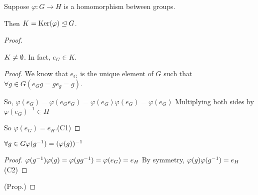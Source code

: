 \documentclass[notes.tex]{subfiles}
\begin{document}
\begin{proposition}
	Suppose $\varphi:G\to H$ is a homomorphism between groups. 

	Then $K=\operatorname{\mathrm{Ker}}(\varphi) \trianglelefteq G$.
\end{proposition}
\begin{proof}
	\begin{claim}[1]
		$K \ne \emptyset$. In fact, $e_G\in K$.
	\end{claim}
	\begin{proof}
		We know that $e_G$ is the unique element of $G$ such that $\forall g\in G(e_Gg=ge_g = g)$.

		So, $\varphi(e_G) = \varphi(e_Ge_G) = \varphi(e_G)\varphi(e_G) = \varphi(e_G)$
		Multiplying both sides by $\varphi(e_G)^{-1}\in H$

		So $\varphi(e_G) = e_H$.\qedhere(C1)
	\end{proof}

	\begin{claim}[2]
		$\forall g\in G \varphi({g}^{-1}) = (\varphi(g))^{-1}$
	\end{claim}
	\begin{proof}
		$\varphi({g}^{-1})\varphi(g) = \varphi(g{g}^{-1}) = \varphi(e_G) = e_H$
		By symmetry, $\varphi(g)\varphi({g}^{-1}) = e_H$\qedhere(C2)
	\end{proof}
	\qedhere(Prop.)
\end{proof}
\end{document}
